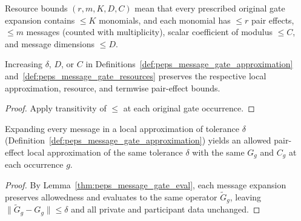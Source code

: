 \begin{definition}
    \label{def:peps_message_gate_resources}
    \leanok
    Resource bounds $(r,m,K,D,C)$ mean that every prescribed original gate expansion contains $\le K$ monomials, and each monomial has $\le r$ pair effects, $\le m$ messages (counted with multiplicity), scalar coefficient of modulus $\le C$, and message dimensions $\le D$.
\end{definition}

\begin{lemma}
    \label{thm:peps_message_gate_bounds_mono}
    \leanok
    Increasing $\delta$, $D$, or $C$ in Definitions~\ref{def:peps_message_gate_approximation} and~\ref{def:peps_message_gate_resources} preserves the respective local approximation, resource, and termwise pair-effect bounds.
\end{lemma}
\begin{proof}
    \leanok
    Apply transitivity of $\le$ at each original gate occurrence.
\end{proof}

\begin{lemma}
    \label{thm:peps_message_expand_gate_approximation}
    \leanok
    Expanding every message in a local approximation of tolerance $\delta$ (Definition~\ref{def:peps_message_gate_approximation}) yields an allowed pair-effect local approximation of the same tolerance $\delta$ with the same $G_g$ and $C_g$ at each occurrence $g$.
\end{lemma}
\begin{proof}
    \leanok
    By Lemma~\ref{thm:peps_message_gate_eval}, each message expansion preserves allowedness and evaluates to the same operator $\widetilde G_g$, leaving $\|\widetilde G_g-G_g\|\le\delta$ and all private and participant data unchanged.
\end{proof}

